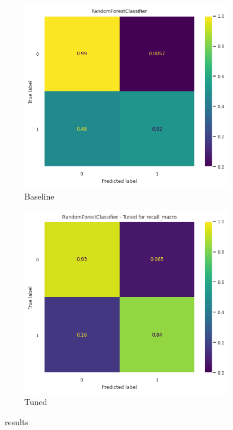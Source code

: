 \begin{frame}{\subsecname}
\begin{figure}
    \centering
    \begin{subfigure}[c]{0.4\textwidth}
        \includegraphics[width=\textwidth]{images/models/RF_base.png}
        \caption{Baseline}
        \label{fig:RF_base}
    \end{subfigure}
    \begin{subfigure}[c]{0.4\textwidth}
        \includegraphics[width=\textwidth]{images/models/RF_tuned.png}
        \caption{Tuned}
        \label{fig:RF_tuned}
    \end{subfigure}
    \caption{\subsecname\ results}
    \label{fig:RF_results}
\end{figure}
\end{frame}

